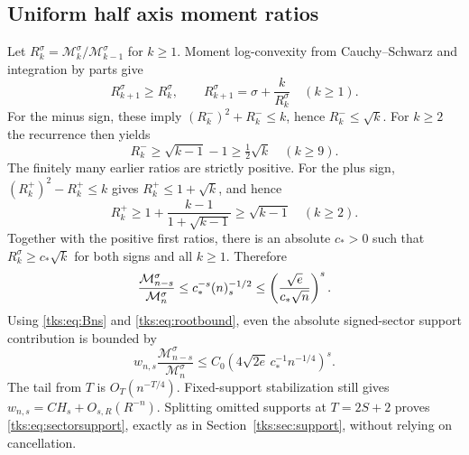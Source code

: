 \subsection{Uniform half axis moment ratios}
Let $R_k^\sigma=\mathcal M_k^\sigma/\mathcal M_{k-1}^\sigma$ for $k\geq1$. Moment log-convexity from Cauchy--Schwarz and integration by parts give
\begin{equation}\label{tks:eq:momentrec}
R_{k+1}^\sigma\geq R_k^\sigma,\qquad
R_{k+1}^\sigma=\sigma+\frac{k}{R_k^\sigma}\quad(k\geq1).
\end{equation}
For the minus sign, these imply $(R_k^-)^2+R_k^-\leq k$, hence $R_k^-\leq\sqrt k$. For $k\geq2$ the recurrence then yields
\[
R_k^-\geq\sqrt{k-1}-1\geq\tfrac12\sqrt k\quad(k\geq9).
\]
The finitely many earlier ratios are strictly positive. For the plus sign, $(R_k^+)^2-R_k^+\leq k$ gives $R_k^+\leq1+\sqrt k$, and hence
\[
R_k^+\geq1+\frac{k-1}{1+\sqrt{k-1}}\geq\sqrt{k-1}
\quad(k\geq2).
\]
Together with the positive first ratios, there is an absolute $c_*>0$ such that $R_k^\sigma\geq c_*\sqrt k$ for both signs and all $k\geq1$. Therefore
\begin{equation}\label{tks:eq:momentbound}
\frac{\mathcal M_{n-s}^\sigma}{\mathcal M_n^\sigma}
 \leq c_*^{-s}(n)_{s}^{-1/2}
 \leq\left(\frac{\sqrt e}{c_*\sqrt n}\right)^s.
\end{equation}
Using \eqref{tks:eq:Bns} and \eqref{tks:eq:rootbound}, even the absolute signed-sector support contribution is bounded by
\[
w_{n,s}\frac{\mathcal M_{n-s}^\sigma}{\mathcal M_n^\sigma}
 \leq C_0\left(4\sqrt{2e}\,c_*^{-1}n^{-1/4}\right)^s.
\]
The tail from $T$ is $O_T(n^{-T/4})$. Fixed-support stabilization still gives $w_{n,s}=CH_s+O_{s,R}(R^{-n})$. Splitting omitted supports at $T=2S+2$ proves \eqref{tks:eq:sectorsupport}, exactly as in Section~\ref{tks:sec:support}, without relying on cancellation.

